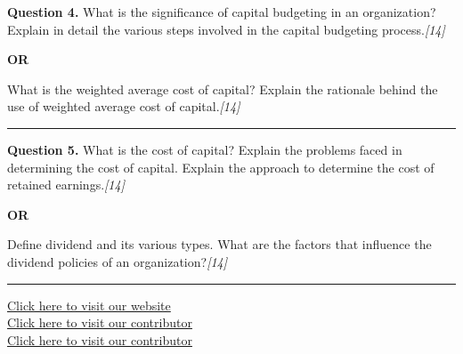 \documentclass[11pt,a4paper]{article}
\newcommand{\pts}[1]{\hfill   \textit{[#1]}}
\begin{document}
\noindent   \textbf{Question 4.}
What is the significance of capital budgeting in an organization? Explain in detail the various steps involved in the capital budgeting process.\pts{14}

\centerline{   \textbf{OR}}

What is the weighted average cost of capital? Explain the rationale behind the use of weighted average cost of capital.\pts{14}

\medskip\rule{\linewidth}{0.2pt}




\noindent   \textbf{Question 5.}
What is the cost of capital? Explain the problems faced in determining the cost of capital. Explain the approach to determine the cost of retained earnings.\pts{14}

\centerline{   \textbf{OR}}

Define dividend and its various types. What are the factors that influence the dividend policies of an organization?\pts{14}

\vfill
\rule{\linewidth}{0.4pt}

\begin{center}\small
\href{https://bhu-exam.vercel.app/}{Click here to visit our website}\\[4pt]
\href{https://me-aryan.vercel.app/}{Click here to visit our contributor}\\[4pt]
\href{https://quashan-me.vercel.app/}{Click here to visit our contributor}
\end{center}
\end{document}
